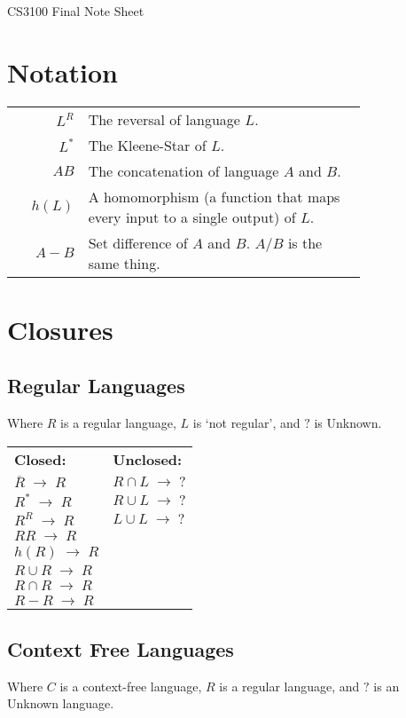 \documentclass[10pt,landscape]{article}
\newcommand{\spto}{%
    \;\to\;%
}
\begin{document}
\begin{multicols*}{3}

\begin{center}
    \Large CS3100 Final Note Sheet
\end{center}

\section{Notation}
\begin{tabular}{rp{0.79\linewidth}}
$L^R$ & The reversal of language $L$. \\
$L^*$ & The Kleene-Star of $L$. \\
$AB$ & The concatenation of language $A$ and $B$. \\
$h(L)$ & A homomorphism (a function that maps every input to 
         a single output) of $L$. \\
$A - B$ & Set difference of $A$ and $B$. $A / B$ is the same thing. \\
\end{tabular}

\section{Closures}
\subsection{Regular Languages}
Where $R$ is a regular language, $L$ is `not regular', and $?$ is Unknown.

\begin{tabular}{ll}
\textbf{Closed:} & \textbf{Unclosed:} \\
$\overline{R} \spto R$ & $R \cap L \spto ?$ \\
$R^* \spto R$ & $R \cup L \spto ?$\\
$R^R \spto R$ & $L \cup L \spto ?$\\
$RR \spto R$ \\
$h(R) \spto R$ \\
$R \cup R \spto R$ \\
$R \cap R \spto R$ \\
$R - R \spto R$
\end{tabular}

\subsection{Context Free Languages}
Where $C$ is a context-free language, $R$ is a regular language, and $?$ is
an Unknown language.


\end{multicols*}
\end{document}
